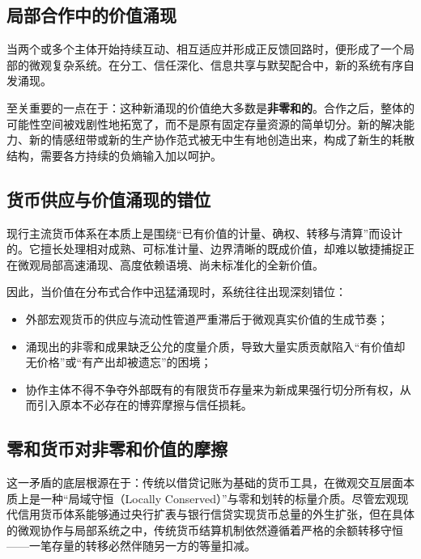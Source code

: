 \documentclass[11pt,a4paper]{ctexart}
\begin{document}
\subsection{局部合作中的价值涌现}
当两个或多个主体开始持续互动、相互适应并形成正反馈回路时，便形成了一个局部的微观复杂系统。在分工、信任深化、信息共享与默契配合中，新的系统有序自发涌现。

至关重要的一点在于：这种新涌现的价值绝大多数是\textbf{非零和的}。合作之后，整体的可能性空间被戏剧性地拓宽了，而不是原有固定存量资源的简单切分。新的解决能力、新的情感纽带或新的生产协作范式被无中生有地创造出来，构成了新生的耗散结构，需要各方持续的负熵输入加以呵护。

\subsection{货币供应与价值涌现的错位}
现行主流货币体系在本质上是围绕“已有价值的计量、确权、转移与清算”而设计的。它擅长处理相对成熟、可标准计量、边界清晰的既成价值，却难以敏捷捕捉正在微观局部高速涌现、高度依赖语境、尚未标准化的全新价值。

因此，当价值在分布式合作中迅猛涌现时，系统往往出现深刻错位：
\begin{itemize}
    \item 外部宏观货币的供应与流动性管道严重滞后于微观真实价值的生成节奏；
    \item 涌现出的非零和成果缺乏公允的度量介质，导致大量实质贡献陷入“有价值却无价格”或“有产出却被遗忘”的困境；
    \item 协作主体不得不争夺外部既有的有限货币存量来为新成果强行切分所有权，从而引入原本不必存在的博弈摩擦与信任损耗。
\end{itemize}

\subsection{零和货币对非零和价值的摩擦}
这一矛盾的底层根源在于：传统以借贷记账为基础的货币工具，在微观交互层面本质上是一种“局域守恒（Locally Conserved）”与零和划转的标量介质。尽管宏观现代信用货币体系能够通过央行扩表与银行信贷实现货币总量的外生扩张，但在具体的微观协作与局部系统之中，传统货币结算机制依然遵循着严格的余额转移守恒——一笔存量的转移必然伴随另一方的等量扣减。
\end{document}

